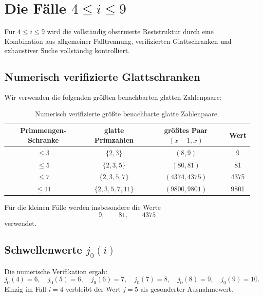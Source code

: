 \documentclass[12pt,a4paper]{article}
\theoremstyle{plain}
\theoremstyle{definition}
\theoremstyle{remark}
\begin{document}
	\section{Die Fälle $4 \le i \le 9$}
	
	Für $4 \le i \le 9$ wird die vollständig obstruierte Reststruktur durch eine Kombination aus allgemeiner Falltrennung, verifizierten Glattschranken und exhaustiver Suche vollständig kontrolliert.
	
	\subsection*{Numerisch verifizierte Glattschranken}
	
	Wir verwenden die folgenden größten benachbarten glatten Zahlenpaare:
	
	\begin{table}[h]
		\centering
		\begin{tabular}{cccc}
			\toprule
			Primmengen-Schranke & glatte Primzahlen & größtes Paar $(x-1,x)$ & Wert \\
			\midrule
			$\le 3$  & $\{2,3\}$         & $(8,9)$       & 9 \\
			$\le 5$  & $\{2,3,5\}$       & $(80,81)$     & 81 \\
			$\le 7$  & $\{2,3,5,7\}$     & $(4374,4375)$ & 4375 \\
			$\le 11$ & $\{2,3,5,7,11\}$  & $(9800,9801)$ & 9801 \\
			\bottomrule
		\end{tabular}
		\caption{Numerisch verifizierte größte benachbarte glatte Zahlenpaare.}
		\label{tab:Bvalues}
	\end{table}
	
	Für die kleinen Fälle werden insbesondere die Werte
	\[
	9,\qquad 81,\qquad 4375
	\]
	verwendet.
	
	\subsection*{Schwellenwerte $j_0(i)$}
	
	Die numerische Verifikation ergab:
	\[
	j_0(4)=6,\quad
	j_0(5)=6,\quad
	j_0(6)=7,\quad
	j_0(7)=8,\quad
	j_0(8)=9,\quad
	j_0(9)=10.
	\]
	Einzig im Fall $i=4$ verbleibt der Wert $j=5$ als gesonderter Ausnahmewert.
	
\end{document}
